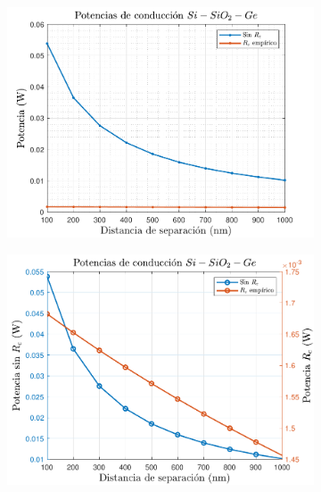 \begin{figure}[H]
	\centering
	\begin{subfigure}[b]{0.49\textwidth}
		\centering
		\includegraphics[width=1.00\textwidth]{figuras/Resultados/conduccion/pdf/Prc_SiSiO2Ge.pdf}
		\caption{ }
		\label{fig:Prc_SiSiO2Ge}
	\end{subfigure}
	\hfill
	\begin{subfigure}[b]{0.49\textwidth}
		\centering
		\includegraphics[width=1.00\textwidth]{figuras/Resultados/conduccion/pdf/Prc2_SiSiO2Ge.pdf}
		\caption{ }
		\label{fig:Prc2_SiSiO2Ge}
	\end{subfigure}
	\caption{ }
	\label{fig:Pcond_SiSiO2Ge}
\end{figure}

